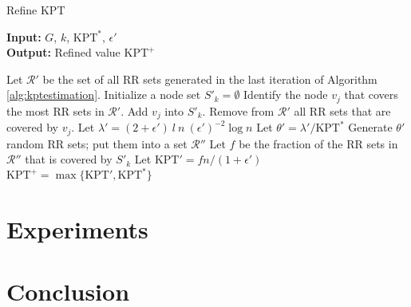 \documentclass[a4paper,12pt]{article}
\begin{document}
\begin{algorithm}
\caption{Refine KPT}\label{alg:kptrefinement}
\hspace*{\algorithmicindent} \textbf{Input: } $G$, $k$, $\text{KPT}^*$, $\epsilon'$\\
\hspace*{\algorithmicindent} \textbf{Output: } Refined value $\text{KPT}^+$
\begin{algorithmic}[1]
\State Let $\mathcal{R}'$ be the set of all RR sets generated in the last iteration of Algorithm \ref{alg:kptestimation}.
\State Initialize a node set $S'_k = \emptyset$
\State Identify the node $v_j$ that covers the most RR sets in $\mathcal{R}'$.
\State Add $v_j$ into $S'_k$.
\State Remove from $\mathcal{R}'$ all RR sets that are covered by $v_j$.
\EndFor
\State Let $\lambda' = (2+\epsilon') \ l \ n \ (\epsilon')^{-2} \log n$
\State Let $\theta' = \lambda' / \text{KPT}^*$
\State Generate $\theta'$ random RR sets; put them into a set $\mathcal{R}''$
\State Let $f$ be the fraction of the RR sets in $\mathcal{R}''$ that is covered by $S'_k$
\State Let $\text{KPT}' = fn/(1+\epsilon')$
\State\Return $\text{KPT}^+ = \max\{\text{KPT}', \text{KPT}^*\}$
\end{algorithmic}
\end{algorithm}


\section{Experiments}
\label{scn:exp}

\section{Conclusion}



\end{document}
